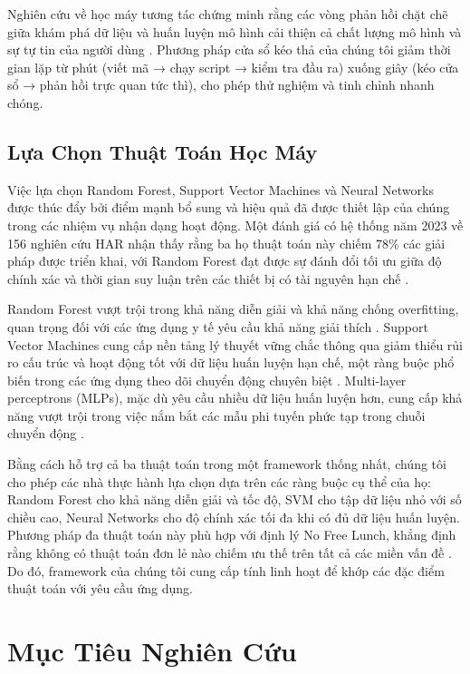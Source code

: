 Nghiên cứu về học máy tương tác chứng minh rằng các vòng phản hồi chặt chẽ giữa khám phá dữ liệu và huấn luyện mô hình cải thiện cả chất lượng mô hình và sự tự tin của người dùng \cite{amershi2014power}. Phương pháp cửa sổ kéo thả của chúng tôi giảm thời gian lặp từ phút (viết mã → chạy script → kiểm tra đầu ra) xuống giây (kéo cửa sổ → phản hồi trực quan tức thì), cho phép thử nghiệm và tinh chỉnh nhanh chóng.

\subsection{Lựa Chọn Thuật Toán Học Máy}

Việc lựa chọn Random Forest, Support Vector Machines và Neural Networks được thúc đẩy bởi điểm mạnh bổ sung và hiệu quả đã được thiết lập của chúng trong các nhiệm vụ nhận dạng hoạt động. Một đánh giá có hệ thống năm 2023 về 156 nghiên cứu HAR nhận thấy rằng ba họ thuật toán này chiếm 78\% các giải pháp được triển khai, với Random Forest đạt được sự đánh đổi tối ưu giữa độ chính xác và thời gian suy luận trên các thiết bị có tài nguyên hạn chế \cite{wang2023har_industrial}.

Random Forest vượt trội trong khả năng diễn giải và khả năng chống overfitting, quan trọng đối với các ứng dụng y tế yêu cầu khả năng giải thích \cite{breiman2001random}. Support Vector Machines cung cấp nền tảng lý thuyết vững chắc thông qua giảm thiểu rủi ro cấu trúc và hoạt động tốt với dữ liệu huấn luyện hạn chế, một ràng buộc phổ biến trong các ứng dụng theo dõi chuyển động chuyên biệt \cite{cortes1995svm}. Multi-layer perceptrons (MLPs), mặc dù yêu cầu nhiều dữ liệu huấn luyện hơn, cung cấp khả năng vượt trội trong việc nắm bắt các mẫu phi tuyến phức tạp trong chuỗi chuyển động \cite{schmidhuber2015deep}.

Bằng cách hỗ trợ cả ba thuật toán trong một framework thống nhất, chúng tôi cho phép các nhà thực hành lựa chọn dựa trên các ràng buộc cụ thể của họ: Random Forest cho khả năng diễn giải và tốc độ, SVM cho tập dữ liệu nhỏ với số chiều cao, Neural Networks cho độ chính xác tối đa khi có đủ dữ liệu huấn luyện. Phương pháp đa thuật toán này phù hợp với định lý No Free Lunch, khẳng định rằng không có thuật toán đơn lẻ nào chiếm ưu thế trên tất cả các miền vấn đề \cite{wolpert1997no}. Do đó, framework của chúng tôi cung cấp tính linh hoạt để khớp các đặc điểm thuật toán với yêu cầu ứng dụng.

\section{Mục Tiêu Nghiên Cứu}

